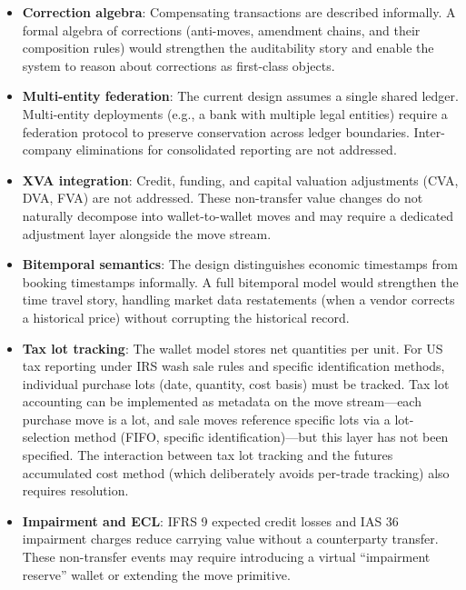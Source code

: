 \documentclass[11pt,a4paper]{article}
\begin{document}
\begin{itemize}
\item \textbf{Correction algebra}: Compensating transactions are described informally. A formal algebra of corrections (anti-moves, amendment chains, and their composition rules) would strengthen the auditability story and enable the system to reason about corrections as first-class objects.

\item \textbf{Multi-entity federation}: The current design assumes a single shared ledger. Multi-entity deployments (e.g., a bank with multiple legal entities) require a federation protocol to preserve conservation across ledger boundaries. Inter-company eliminations for consolidated reporting are not addressed.

\item \textbf{XVA integration}: Credit, funding, and capital valuation adjustments (CVA, DVA, FVA) are not addressed. These non-transfer value changes do not naturally decompose into wallet-to-wallet moves and may require a dedicated adjustment layer alongside the move stream.

\item \textbf{Bitemporal semantics}: The design distinguishes economic timestamps from booking timestamps informally. A full bitemporal model would strengthen the time travel story, handling market data restatements (when a vendor corrects a historical price) without corrupting the historical record.

\item \textbf{Tax lot tracking}: The wallet model stores net quantities per unit. For US tax reporting under IRS wash sale rules and specific identification methods, individual purchase lots (date, quantity, cost basis) must be tracked. Tax lot accounting can be implemented as metadata on the move stream---each purchase move is a lot, and sale moves reference specific lots via a lot-selection method (FIFO, specific identification)---but this layer has not been specified. The interaction between tax lot tracking and the futures accumulated cost method (which deliberately avoids per-trade tracking) also requires resolution.

\item \textbf{Impairment and ECL}: IFRS 9 expected credit losses and IAS 36 impairment charges reduce carrying value without a counterparty transfer. These non-transfer events may require introducing a virtual ``impairment reserve'' wallet or extending the move primitive.


\end{itemize}
\end{document}

